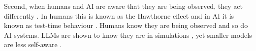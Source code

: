 Second, when humans and AI are aware that they are being observed, they act differently \cite{orneSocialPsychologyPsychological1962}. In humans this is known as the Hawthorne effect \cite{adairHawthorneEffectReconsideration1984} and in AI it is known as test-time behaviour \cite{vanderweijAISandbaggingLanguage2025,greenblattAlignmentFakingLarge2024}. Humans know they are being observed and so do AI systems. LLMs are shown to know they are in simulations \cite{laineMeMyselfAI2024,phuongEvaluatingFrontierModels2025,needhamLargeLanguageModels2025,berglundTakenOutContext2023}, yet smaller models are less self-aware \cite{chaudharyEvaluationAwarenessScales2025}.
